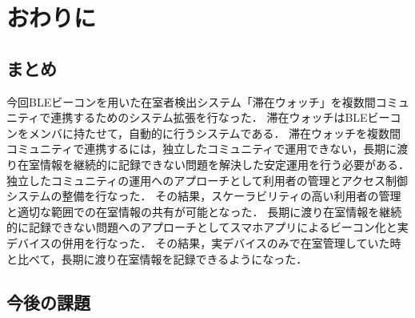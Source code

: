 \chapter{おわりに}
\thispagestyle{myheadings}

\section{まとめ}

今回BLEビーコンを用いた在室者検出システム「滞在ウォッチ」を複数間コミュニティで連携するためのシステム拡張を行なった．
滞在ウォッチはBLEビーコンをメンバに持たせて，自動的に行うシステムである．
滞在ウォッチを複数間コミュニティで連携するには，独立したコミュニティで運用できない，長期に渡り在室情報を継続的に記録できない問題を解決した安定運用を行う必要がある．
独立したコミュニティの運用へのアプローチとして利用者の管理とアクセス制御システムの整備を行なった．
その結果，スケーラビリティの高い利用者の管理と適切な範囲での在室情報の共有が可能となった．
長期に渡り在室情報を継続的に記録できない問題へのアプローチとしてスマホアプリによるビーコン化と実デバイスの併用を行なった．
その結果，実デバイスのみで在室管理していた時と比べて，長期に渡り在室情報を記録できるようになった．


\section{今後の課題}

